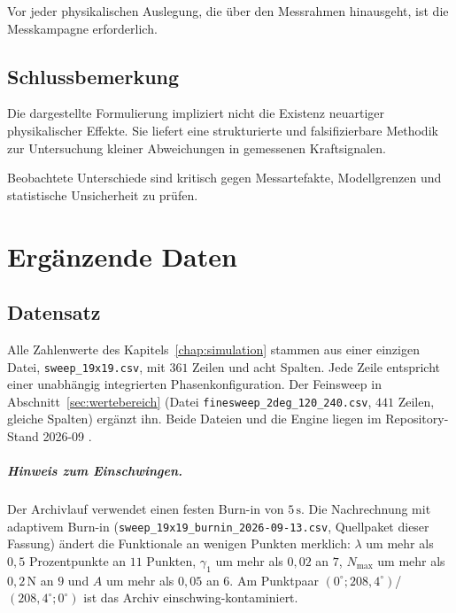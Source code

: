 \documentclass[12pt,a4paper]{report}
\begin{document}
Vor jeder physikalischen Auslegung, die über den Messrahmen hinausgeht,
ist die Messkampagne erforderlich.

\section{Schlussbemerkung}

Die dargestellte Formulierung impliziert nicht die Existenz neuartiger
physikalischer Effekte. Sie liefert eine strukturierte und
falsifizierbare Methodik zur Untersuchung kleiner Abweichungen in
gemessenen Kraftsignalen.

Beobachtete Unterschiede sind kritisch gegen Messartefakte,
Modellgrenzen und statistische Unsicherheit zu prüfen.


\appendix

\chapter{Ergänzende Daten}
\label{app:daten}

\section{Datensatz}
\label{sec:anh-datensatz}

Alle Zahlenwerte des Kapitels~\ref{chap:simulation} stammen aus einer
einzigen Datei, \texttt{sweep\_19x19.csv}, mit $361$ Zeilen und acht
Spalten. Jede Zeile entspricht einer unabhängig integrierten
Phasenkonfiguration. Der Feinsweep in Abschnitt~\ref{sec:wertebereich}
(Datei \texttt{finesweep\_2deg\_120\_240.csv}, $441$ Zeilen, gleiche
Spalten) ergänzt ihn. Beide Dateien und die Engine liegen im
Repository-Stand 2026-09 \cite{frueh2026repo}.

\paragraph{Hinweis zum Einschwingen.}
Der Archivlauf verwendet einen festen Burn-in von $5\,\mathrm{s}$. Die
Nachrechnung mit adaptivem Burn-in
(\texttt{sweep\_19x19\_burnin\_2026-09-13.csv}, Quellpaket dieser Fassung) ändert die Funktionale an wenigen Punkten merklich:
$\lambda$ um mehr als $0{,}5$ Prozentpunkte an $11$ Punkten, $\gamma_1$
um mehr als $0{,}02$ an $7$, $N_{\max}$ um mehr als $0{,}2\,\mathrm{N}$ an
$9$ und $A$ um mehr als $0{,}05$ an $6$. Am Punktpaar
$(0^\circ; 208{,}4^\circ)$/$(208{,}4^\circ; 0^\circ)$ ist das Archiv
einschwing-kontaminiert.
\end{document}
